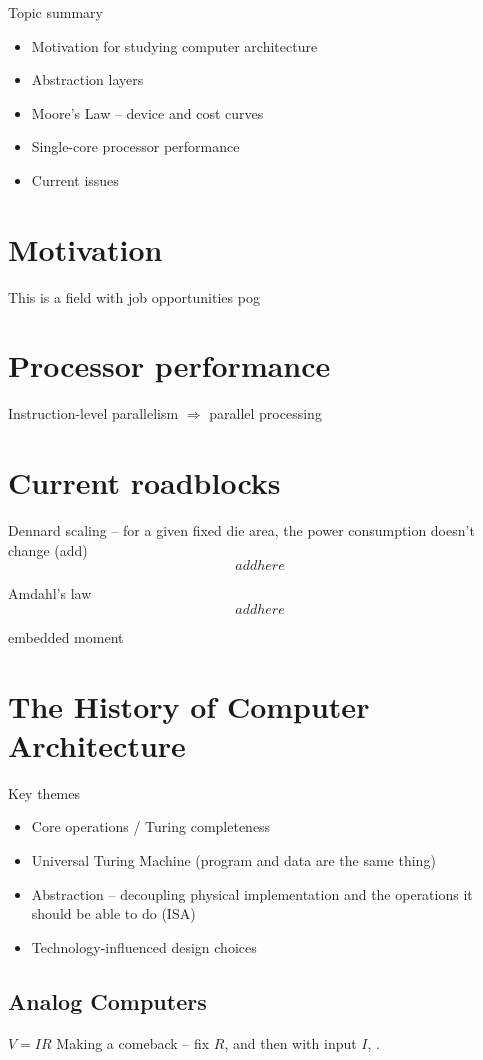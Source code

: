 Topic summary
\begin{itemize}
    \item Motivation for studying computer architecture
    \item Abstraction layers
    \item Moore's Law -- device and cost curves
    \item Single-core processor performance
    \item Current issues
\end{itemize}

\section{Motivation}
This is a field with job opportunities pog


\section{Processor performance}
Instruction-level parallelism $\Rightarrow$ parallel processing


\section{Current roadblocks}
Dennard scaling -- for a given fixed die area, the power consumption doesn't change (add)
$$addhere$$

Amdahl's law
$$addhere$$

embedded moment


\section{The History of Computer Architecture}

Key themes
\begin{itemize}
    \item Core operations / Turing completeness
    \item Universal Turing Machine (program and data are the same thing)
    \item Abstraction -- decoupling physical implementation and the operations it should be able to do (ISA)
    \item Technology-influenced design choices
\end{itemize}



\subsection{Analog Computers}
$V = IR$
Making a comeback -- fix $R$, and then with input $I$, .

